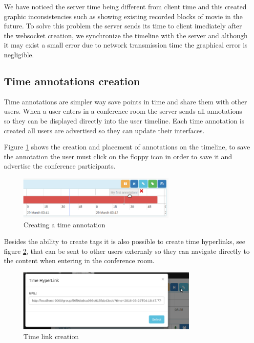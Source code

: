 	We have noticed the server time being different from client time and this created graphic inconsistencies such as showing existing recorded blocks of movie in the future. To solve this problem the server sends its time to client imediately after the websocket creation, we synchronize the timeline with the server and although it may exist a small error due to network transmission time the graphical error is negligible. 


	\subsection{Time annotations creation}

	Time annotations are simpler way save points in time and share them with other users. When a user enters in a conference room the server sends all annotations so they can be displayed directly into the user timeline. Each time annotation is created all users are advertised so they can update their interfaces.

	Figure \ref{fig:annotation} shows the creation and placement of annotations on the timeline, to save the annotation the user must click on the floppy icon in order to save it and advertise the conference participants. 

	\begin{figure}[!htb]
		\centering
		\includegraphics[width=0.7\textwidth]{figures/annotation.png}
		\caption{Creating a time annotation}
		\label{fig:annotation}
	\end{figure}

	Besides the ability to create tags it is also possible to create time hyperlinks, see figure \ref{fig:timelink}, that can be sent to other users externaly so they can navigate directly to the content when entering in the conference room.


	\begin{figure}[!htb]
		\centering
		\includegraphics[width=0.8\textwidth]{figures/timelink.png}
		\caption{Time link creation}
		\label{fig:timelink}
	\end{figure}


